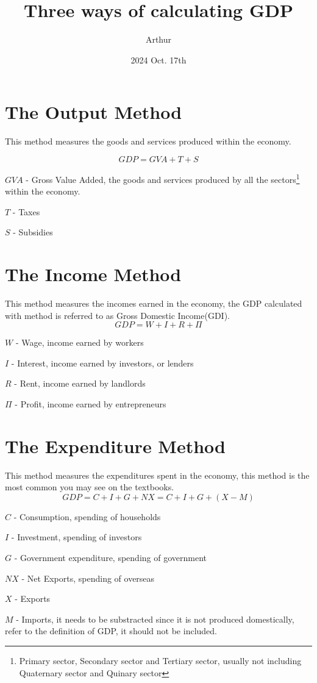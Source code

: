 \documentclass{article}
\title{Three ways of calculating GDP}
\author{Arthur}
\date{2024 Oct. 17th}
\begin{document}
\maketitle

\section{The Output Method}
This method measures the goods and services produced within the economy.

\begin{equation}
GDP = GVA + T + S
\end{equation}

$GVA$ - Gross Value Added, the goods and services produced by all the sectors\footnote{Primary sector, Secondary sector and Tertiary sector, usually not including Quaternary sector and Quinary sector} within the economy.

$T$ - Taxes

$S$ - Subsidies

\section{The Income Method}
This method measures the incomes earned in the economy, the GDP calculated with method is referred to as Gross Domestic Income(GDI).
\begin{equation}
GDP = W + I + R + \Pi
\end{equation}

$W$ - Wage, income earned by workers

$I$ - Interest, income earned by investors, or lenders

$R$ - Rent, income earned by landlords

$\Pi$ - Profit, income earned by entrepreneurs

\section{The Expenditure Method}
This method measures the expenditures spent in the economy, this method is the most common you may see on the textbooks.
\begin{equation}
GDP = C + I + G + NX
    = C + I + G + (X-M)
\end{equation}

$C$ - Consumption, spending of households

$I$ - Investment, spending of investors

$G$ - Government expenditure, spending of government

$NX$ - Net Exports, spending of overseas

$X$ - Exports

$M$ - Imports, it needs to be substracted since it is not produced domestically, refer to the definition of GDP, it should not be included.
\end{document}
